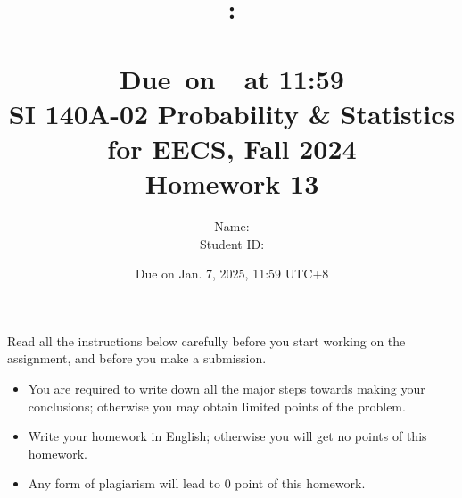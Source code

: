 \documentclass[a4paper]{article}
\title{
    \vspace{2in}
    \textmd{\textbf{\hmwkClass:\\  \hmwkTitle}}\\
    \normalsize\vspace{0.1in}\small{Due\ on\ \hmwkDueDate\ at 11:59}\\
	\vspace{4in}
}
\author{
	Name: \textbf{\hmwkAuthorName} \\
	Student ID: \hmwkAuthorID}
\date{}
\begin{document}

\date{
Due on Jan. 7, 2025, 11:59 UTC+8}
\title{SI 140A-02  Probability \& Statistics for EECS, Fall 2024 \\
Homework 13}
\maketitle
Read all the instructions below carefully before you start working on the assignment, and before you make a submission.
\begin{itemize}
    \item You are required to write down all the major steps towards making your conclusions; otherwise you may obtain limited points of the problem.
    \item Write your homework in English; otherwise you will get no points of this homework.
    \item Any form of plagiarism will lead to $0$ point of this homework. 
\end{itemize}
\newpage
\end{document}
